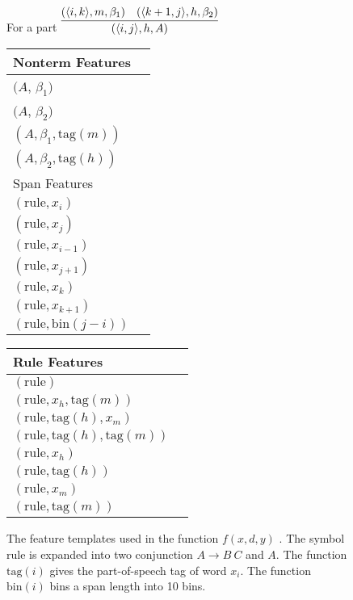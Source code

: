 \documentclass[11pt,letterpaper]{article}
\newcommand{\Span}[1]{\langle #1 \rangle}
\newcommand{\RuleSym}{\mathrm{rule}}
\newcommand{\Rule}[3]{#1 \rightarrow #2\ #3}
\newcommand{\BinFN}[1]{\mathrm{bin}({#1})}
\newcommand{\TagFN}[1]{\mathrm{tag}({#1})}
\newcommand{\WordFN}[1]{x_{#1}}
\begin{document}
\begin{figure}
  \footnotesize
  \centering
  For a part $ \infer{(\Span{i, j}, h, A)}{(\Span{i, k}, m, \beta_1) &  (\Span{k+1, j}, h, \beta_2)} $

  \vspace{0.5cm}

  \begin{multicols}{2}

  \begin{tabular}{|l|l}

  \hline
  Nonterm Features \\
  \hline

  \hline
  $(A$, $\beta_1)$ \\
  $(A$, $\beta_2)$ \\
  $(A, \beta_1, \TagFN{m})$ \\
  $(A, \beta_2, \TagFN{h})$ \\
  \hline
    \hline
  Span Features \\
  \hline

  \hline
  $(\RuleSym, \WordFN{i})$\\
  $(\RuleSym, \WordFN{j})$\\
  $(\RuleSym, \WordFN{i-1})$\\
  $(\RuleSym, \WordFN{j+1})$\\
  $(\RuleSym, \WordFN{k})$\\
  $(\RuleSym, \WordFN{k+1})$\\
  $(\RuleSym, \BinFN{j-i})$\\
  \hline

  \end{tabular}

  \begin{tabular}{|l|l}

  \hline


  Rule Features \\
  \hline

  \hline

  $(\RuleSym  )$\\
  $(\RuleSym, \WordFN{h}, \TagFN{m})$ \\
  $(\RuleSym, \TagFN{h}, \WordFN{m})$ \\
  $(\RuleSym, \TagFN{h}, \TagFN{m})$ \\

  $(\RuleSym, \WordFN{h})$ \\
  $(\RuleSym, \TagFN{h})$ \\
  $(\RuleSym, \WordFN{m})$ \\
  $(\RuleSym, \TagFN{m})$ \\

  \hline

  \end{tabular}
  \end{multicols}
  \label{fig:features}
  \caption{The feature templates used in the function $f(x, d, y)$ . The symbol $\RuleSym$ is expanded into two conjunction $\Rule{A}{B}{C}$ and $A$. The function $\TagFN{i}$ gives the part-of-speech tag of word $x_i$. The function $\BinFN{i}$ bins a span length into 10 bins.
  }
\end{figure}
\end{document}
